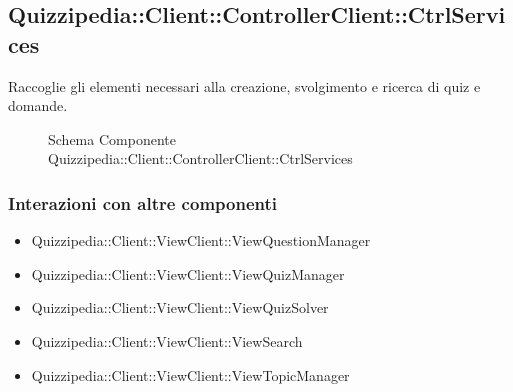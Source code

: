 \subsection{Quizzipedia::Client::ControllerClient::CtrlServices}
Raccoglie gli elementi necessari alla creazione, svolgimento e ricerca di quiz e domande.
\begin{figure}[H]
\centering
\noindent{}
\caption[Schema Componente Quizzipedia::Client::ControllerClient::CtrlServices]{Schema Componente Quizzipedia::Client::ControllerClient::CtrlServices}
\end{figure}
\subsubsection{Interazioni con altre componenti}
\begin{itemize}
\item Quizzipedia::Client::ViewClient::ViewQuestionManager
\item Quizzipedia::Client::ViewClient::ViewQuizManager
\item Quizzipedia::Client::ViewClient::ViewQuizSolver
\item Quizzipedia::Client::ViewClient::ViewSearch
\item Quizzipedia::Client::ViewClient::ViewTopicManager
\end{itemize}
